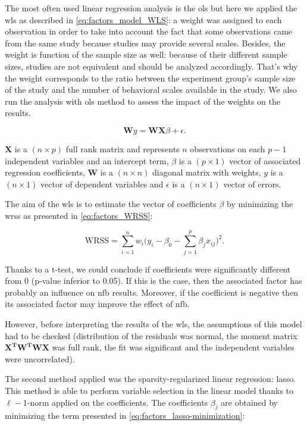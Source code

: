 The most often used linear regression analysis is the \gls{ols} but here we applied the \gls{wls} as described in \cref{eq:factors_model_WLS}: a 
weight was assigned to each observation in order to take into account the fact that some observations came from the same study because studies 
may provide several scales. Besides, the weight is function of the sample size as well: because of their different sample sizes, studies are not 
equivalent and should be analyzed accordingly. That's why the weight corresponds to the ratio between the experiment group's sample size of the study and 
the number of behavioral scales available in the study. We also run the analysis
 with \gls{ols} method to assess the impact of the weights on the results. 

\begin{equation}
\label{eq:factors_model_WLS}
\textbf{W}y = \textbf{WX}\beta + \epsilon .
\end{equation}

$\textbf{X}$ is a $(n \times p)$ full rank matrix and represents $n$ observations on each $p-1$ independent variables and an 
intercept term, $\beta$ is a $(p \times 1)$ vector of associated regression coefficients, $\textbf{W}$ is a $(n \times n)$ diagonal 
matrix with weights, $y$ is a $(n \times 1)$ vector of dependent variables and $\epsilon$ is a $(n \times 1)$ vector of errors.

The aim of the \gls{wls} is to estimate the vector of coefficients $\beta$ by minimizing the \gls{wrss} as presented in \cref{eq:factors_WRSS}:

\begin{equation}
\label{eq:factors_WRSS}
\text{WRSS} = \sum_{i=1}^{n} w_i \Big(y_i - \beta_{0} - \sum_{j=1}^{p}\beta_{j}x_{ij}\Big)^2 .
\end{equation}

Thanks to a t-test, we could conclude if coefficients were significantly different from 0 (p-value 
inferior to 0.05). If this is the case, then the associated factor has probably an influence on \gls{nfb} results. Moreover, if the coefficient is 
negative then its associated factor may improve the effect of \gls{nfb}. 

However, before interpreting the results of the \gls{wls}, the assumptions of this model had to be checked (distribution of the residuals was normal,
the moment matrix $\mathbf{{X}^{T}W^{T}WX}$ was full rank, the fit was significant and the independent variables were uncorrelated).

The second method applied was the sparsity-regularized linear regression: \gls{lasso}. This method is able to perform variable selection 
in the linear model thanks to $\ell-1$-norm applied on the coefficients. The coefficients $\beta_j$ are obtained by minimizing the term 
presented in \cref{eq:factors_lasso-minimization}:

